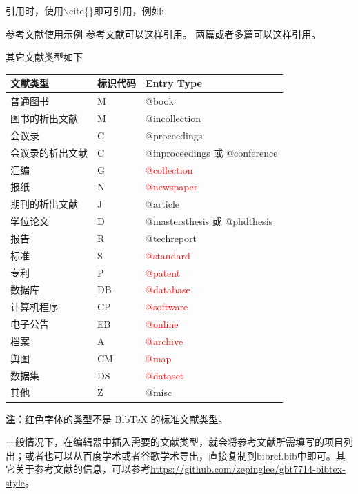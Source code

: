 \noindent 引用时，使用{\ttfamily$\backslash$cite\{\}}即可引用，例如:
\begin{myexample}{参考文献使用示例}
参考文献可以这样引用\cite{Liu2013}。
两篇或者多篇可以这样引用\cite{Liu2013,Driscoll2024aaa}。
\end{myexample}

\noindent 其它文献类型如下
\begin{mybox}
\begin{tabular}{p{5cm}p{2cm}p{7cm}}
文献类型         &  标识代码 &  Entry Type\\
\hline
普通图书         &  M        &  @book \\
图书的析出文献   &  M        &  @incollection\\
会议录           &  C        &  @proceedings\\
会议录的析出文献 &  C        &  @inproceedings 或 @conference\\
汇编             &  G        & \textcolor{red}{@collection}\\
报纸             &  N        & \textcolor{red}{@newspaper}\\
期刊的析出文献   &  J        &  @article\\
学位论文         &  D        &  @mastersthesis 或 @phdthesis\\
报告             &  R        &  @techreport\\
标准             &  S        &  \textcolor{red}{@standard}\\
专利             &  P        &  \textcolor{red}{@patent}\\
数据库           &  DB       &  \textcolor{red}{@database}\\
计算机程序       &  CP       &  \textcolor{red}{@software}\\
电子公告         &  EB       & \textcolor{red}{@online}\\
档案             &  A        & \textcolor{red}{@archive}\\
舆图             &  CM       & \textcolor{red}{@map}\\
数据集           &  DS       & \textcolor{red}{@dataset}\\
其他             &  Z        &  @misc\\
\hline
\end{tabular}

\vspace{0.5cm}
{\bfseries 注：}红色字体的类型不是 BibTeX 的标准文献类型。
\end{mybox}
\noindent 一般情况下，在编辑器中插入需要的文献类型，就会将参考文献所需填写的项目列出；或者也可以从百度学术或者谷歌学术导出，直接复制到bibref.bib中即可。其它关于参考文献的信息，可以参考\url{https://github.com/zepinglee/gbt7714-bibtex-style}。